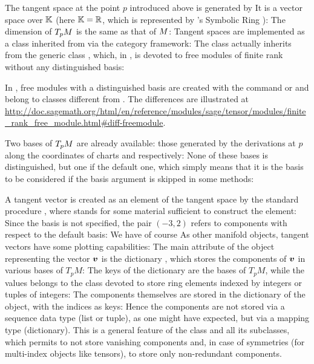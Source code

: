 The tangent space at the point $p$ introduced above is generated by
It is a vector space over $\mathbb{K}$ (here $\mathbb{K}=\mathbb{R}$, which is represented by \Sage{}'s Symbolic
Ring ):
The dimension of $T_pM$ is the same as that of $M$:
Tangent spaces are implemented as a class inherited from 
via the category framework:
The class  actually inherits from the generic class
, which, in \Sage{}, is devoted to free modules of finite rank
without any distinguished basis:
\begin{remark}
In \Sage{}, free modules with a distinguished basis
are created with the command  or 
and belong to classes different from .
The differences are illustrated at\\
{\scriptsize \url{http://doc.sagemath.org/html/en/reference/modules/sage/tensor/modules/finite_rank_free_module.html#diff-freemodule}}.
\end{remark}

Two bases of $T_pM$ are already available: those generated by the derivations
at $p$ along the coordinates of charts  and  respectively:
None of these bases is distinguished, but one if the default one, which
simply means that it is the basis to be considered if the basis argument
is skipped in some methods:

A tangent vector is created as an element of the tangent space by the
standard \Sage{} procedure
, where 
stands for some material sufficient to construct the element:
Since the basis is not specified, the pair $(-3,2)$ refers to components
with respect to the default basis:
We have of course
As other manifold objects, tangent vectors have some plotting capabilities:
The main attribute of the object  representing the vector $\bm{v}$ is the dictionary , which stores the components of $\bm{v}$ in various bases of $T_p M$:
The keys of the dictionary  are the bases of $T_p M$, while the values belongs to the class  devoted to store ring elements indexed by integers or tuples of integers:
The components themselves are stored in the dictionary  of the  object, with the indices as keys:
Hence the components are not stored via a sequence data type (list or tuple), as
one might have expected, but via a mapping type (dictionary). This is a general
feature of the class  and all its subclasses, which permits
to not store vanishing components and, in case of symmetries (for multi-index
objects like tensors), to store only non-redundant components.

